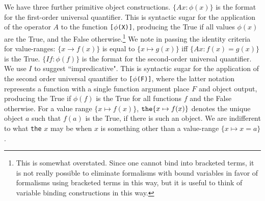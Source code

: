 \documentclass{article}
\begin{document}
We have three further primitive object constructions.  $\{Ax:\phi(x)\}$ is the format for the first-order universal quantifier.  This is syntactic sugar for the application of the operator
$A$ to the function {\tt [$\phi$(X)]}, producing the True if all values $\phi(x)$ are the True, and the False otherwise.\footnote{This is somewhat overstated.  Since one cannot bind into bracketed terms, it is not really possible to eliminate formalisms with bound variables in favor of formalisms using bracketed terms in this way, but it is useful to think of variable binding constructions in this way.}  We note in passing the identity criteria for value-ranges:  $\{x \rightarrow f(x)\}$ is equal to $\{x \mapsto g(x)\}$ iff $\{Ax:f(x)=g(x)\}$ is the True.  $\{If:\phi(f)\}$ is the format for the second-order universal quantifier.  We use $I$ to suggest ``impredicative".
This is syntactic sugar for the application of the second order universal quantifier to {\tt [$\phi$(F)]}, where the latter notation represents a function with a single function argument place $F$
and object output, producing the True if $\phi(f)$ is the True for all functions $f$ and the False otherwise.  For a value range $\{x \mapsto f(x)\}$, ${\tt the}\{x \mapsto f(x)\}$ denotes the unique object $a$ such that $f(a)$ is the True, if there is such an object.  We are indifferent to what {\tt the} $x$ may be when $x$ is something other than a value-range
$\{x \mapsto x=a\}$.
\end{document}
